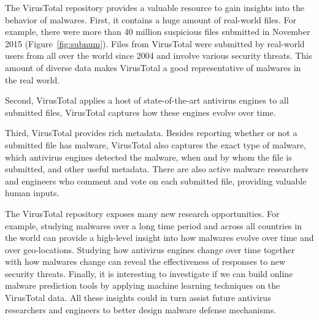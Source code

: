 The VirusTotal repository provides a valuable resource to gain insights into 
the behavior of malwares.
%
First, it contains a huge amount of real-world files.
For example, there were more than 40 million suspicious files submitted in November 2015 (Figure~\ref{fig:subnum}). 
Files from VirusTotal were submitted by real-world users from all over the world since 2004
and involve various security threats. 
This amount of diverse data makes VirusTotal a good representative of malwares in the real world. 

Second, VirusTotal applies a host of state-of-the-art antivirus engines to all submitted files,
VirusTotal captures how these engines evolve over time.

Third, VirusTotal provides rich metadata. 
Besides reporting whether or not a submitted file has malware, 
VirusTotal also captures the exact type of malware, 
which antivirus engines detected the malware,
when and by whom the file is submitted,
and other useful metadata.
There are also active malware researchers and engineers
who comment and vote on each submitted file, 
providing valuable human inputs. 

The VirusTotal repository exposes many new research opportunities.
For example, studying malwares over a long time period and across all countries in the world 
can provide a high-level insight into how malwares evolve over time and over geo-locations.
Studying how antivirus engines change over time together with how malwares change can 
reveal the effectiveness of responses to new security threats.
Finally, it is interesting to investigate if we can build online malware prediction tools 
by applying machine learning techniques on the VirusTotal data.
All these insights could in turn assist future antivirus researchers and engineers
to better design malware defense mechanisms.


